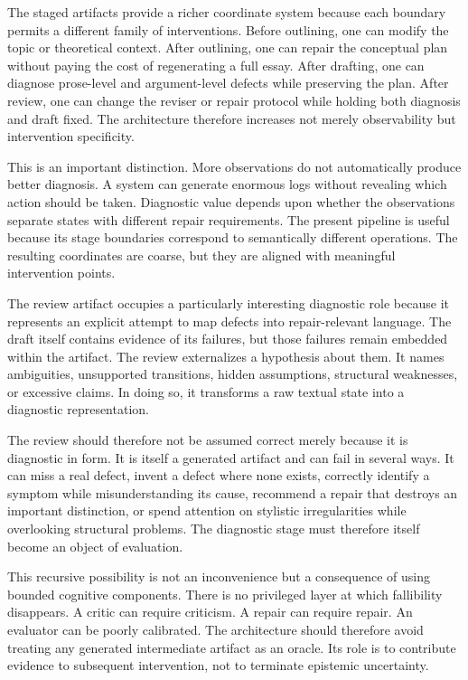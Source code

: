 \documentclass[11pt]{article}
\begin{document}
The staged artifacts provide a richer coordinate system because each boundary permits a different family of interventions. Before outlining, one can modify the topic or theoretical context. After outlining, one can repair the conceptual plan without paying the cost of regenerating a full essay. After drafting, one can diagnose prose-level and argument-level defects while preserving the plan. After review, one can change the reviser or repair protocol while holding both diagnosis and draft fixed. The architecture therefore increases not merely observability but intervention specificity.

This is an important distinction. More observations do not automatically produce better diagnosis. A system can generate enormous logs without revealing which action should be taken. Diagnostic value depends upon whether the observations separate states with different repair requirements. The present pipeline is useful because its stage boundaries correspond to semantically different operations. The resulting coordinates are coarse, but they are aligned with meaningful intervention points.

The review artifact occupies a particularly interesting diagnostic role because it represents an explicit attempt to map defects into repair-relevant language. The draft itself contains evidence of its failures, but those failures remain embedded within the artifact. The review externalizes a hypothesis about them. It names ambiguities, unsupported transitions, hidden assumptions, structural weaknesses, or excessive claims. In doing so, it transforms a raw textual state into a diagnostic representation.

The review should therefore not be assumed correct merely because it is diagnostic in form. It is itself a generated artifact and can fail in several ways. It can miss a real defect, invent a defect where none exists, correctly identify a symptom while misunderstanding its cause, recommend a repair that destroys an important distinction, or spend attention on stylistic irregularities while overlooking structural problems. The diagnostic stage must therefore itself become an object of evaluation.

This recursive possibility is not an inconvenience but a consequence of using bounded cognitive components. There is no privileged layer at which fallibility disappears. A critic can require criticism. A repair can require repair. An evaluator can be poorly calibrated. The architecture should therefore avoid treating any generated intermediate artifact as an oracle. Its role is to contribute evidence to subsequent intervention, not to terminate epistemic uncertainty.
\end{document}
